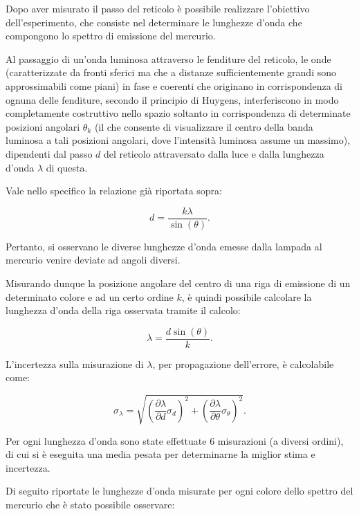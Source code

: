 \documentclass[a4paper,12pt]{article}
\begin{document}
Dopo aver misurato il passo del reticolo è possibile realizzare l’obiettivo dell’esperimento, che consiste nel determinare le lunghezze d’onda che compongono lo spettro di emissione del mercurio.

Al passaggio di un’onda luminosa attraverso le fenditure del reticolo, le onde (caratterizzate da fronti sferici ma che a distanze sufficientemente grandi sono approssimabili come piani) in fase e coerenti che originano in corrispondenza di ognuna delle fenditure, secondo il principio di Huygens, interferiscono in modo completamente costruttivo nello spazio soltanto in corrispondenza di determinate posizioni angolari \( \theta_k \) (il che consente di visualizzare il centro della banda luminosa a tali posizioni angolari, dove l’intensità luminosa assume un massimo), dipendenti dal passo \( d \) del reticolo attraversato dalla luce e dalla lunghezza d’onda \( \lambda \) di questa.

Vale nello specifico la relazione già riportata sopra:

\[
d = \frac{k\lambda}{\sin(\theta)}.
\]

Pertanto, si osservano le diverse lunghezze d’onda emesse dalla lampada al mercurio venire deviate ad angoli diversi.

Misurando dunque la posizione angolare del centro di una riga di emissione di un determinato colore e ad un certo ordine \( k \), è quindi possibile calcolare la lunghezza d’onda della riga osservata tramite il calcolo:

\[
\lambda = \frac{d \sin(\theta)}{k}.
\]

L’incertezza sulla misurazione di \( \lambda \), per propagazione dell’errore, è calcolabile come:

\[
\sigma_\lambda = \sqrt{\left(\frac{\partial \lambda}{\partial d} \sigma_d\right)^2 + \left(\frac{\partial \lambda}{\partial \theta} \sigma_\theta\right)^2}.
\]

Per ogni lunghezza d’onda sono state effettuate 6 misurazioni (a diversi ordini), di cui si è eseguita una media pesata per determinarne la miglior stima e incertezza.

Di seguito riportate le lunghezze d’onda misurate per ogni colore dello spettro del mercurio che è stato possibile osservare:
\end{document}
